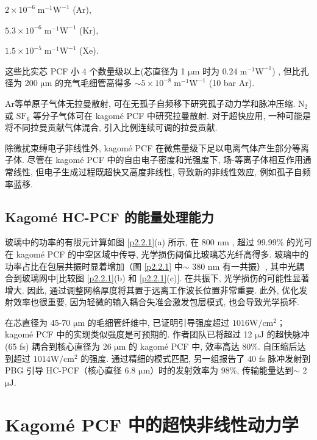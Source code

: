\documentclass[14pt,a4paper,oneside]{article}
\numberwithin{equation}{subsection}             %
\numberwithin{figure}{subsection}               %
\begin{document}
 $ 2 \times  10^{-6} \;\mathrm{m^{-1}W^{-1}}$ (Ar), 
 
 $ 5.3 \times  10^{-6} \;\mathrm{m^{-1}W^{-1}}$ (Kr),
 
 $ 1.5 \times  10^{-5} \;\mathrm{m^{-1}W^{-1}}$ (Xe). 
 
 这些比实芯 PCF 小 4 个数量级以上(芯直径为 1 $\mathrm{\mu m}$ 时为 $0.24\; \mathrm{m^{-1}W^{-1}}$) , 但比孔径为 200 $\mathrm{\mu m}$ 的充气毛细管高得多 $\sim 5 \times  10^{-8}\; \mathrm{m^{-1}W^{-1}}$ (10 bar Ar). 

Ar等单原子气体无拉曼散射, 可在无孤子自频移下研究孤子动力学和脉冲压缩. $\mathrm{N_{2}}$ 或 $\mathrm{SF_{6}}$ 等分子气体可在 kagomé PCF 中研究拉曼散射. 对于超快应用, 一种可能是将不同拉曼贡献气体混合, 引入比例连续可调的拉曼贡献. 

除微扰束缚电子非线性外, kagomé PCF 在微焦量级下足以电离气体产生部分等离子体. 尽管在 kagomé PCF 中的自由电子密度和光强度下, 场-等离子体相互作用通常线性, 但电子生成过程既超快又高度非线性, 导致新的非线性效应, 例如孤子自频率蓝移. 

\subsection{Kagomé HC-PCF 的能量处理能力}

玻璃中的功率的有限元计算如图 \ref{p2.2.1}(a) 所示, 在 800 nm , 超过 99.99\% 的光可在 kagomé PCF 的中空区域中传导, 光学损伤阈值比玻璃芯光纤高得多. 玻璃中的功率占比在包层共振时显着增加（图 \ref{p2.2.1} 中$\sim$ 380 nm 有一共振）, 其中光耦合到玻璃网中[比较图 \ref{p2.2.1}(b) 和 \ref{p2.2.1}(c)]. 在共振下, 光学损伤的可能性显著增大. 因此, 通过调整网格厚度将其置于远离工作波长位置非常重要. 此外, 优化发射效率也很重要, 因为轻微的输入耦合失准会激发包层模式, 也会导致光学损坏. 

在芯直径为 45-70 $\mathrm{\mu m}$ 的毛细管纤维中, 已证明引导强度超过 $1016 \mathrm{W/cm^{2}}$； kagomé PCF 中的实现类似强度是可预期的. 作者团队已将超过 12 $\mathrm{\mu J}$ 的超快脉冲 (65 fs) 耦合到核心直径为 26 $\mathrm{\mu m}$ 的 kagomé PCF 中, 效率高达 80\%. 自压缩后达到超过 $1014 \mathrm{W/cm^{2}}$ 的强度. 通过精细的模式匹配, 另一组报告了 40 fs 脉冲发射到 PBG 引导 HC-PCF（核心直径 6.8 $\mathrm{\mu m}$）时的发射效率为 98\%, 传输能量达到$\sim$ 2 $\mathrm{\mu J}$\cite{ishaayaHighlyefficientCouplingLinearly2009}. 

\section{Kagomé PCF 中的超快非线性动力学}
\end{document}
